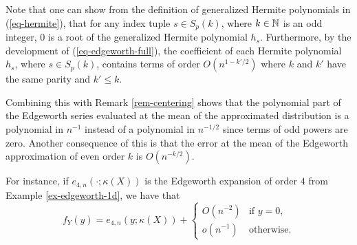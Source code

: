 \begin{remark} \label{rem-edge-mean}
    Note that one can show from the definition of generalized Hermite polynomials in (\ref{eq-hermite}), that for any index tuple $s \in S_p(k)$, where $k \in \mathbb{N}$ is an odd integer, 0 is a root of the generalized Hermite polynomial $h_s$. 
    Furthermore, by the development of (\ref{eq-edgeworth-full}), the coefficient of each Hermite polynomial $h_s$, where $s \in S_p(k)$, contains terms of order $O(n^{1-k'/2})$ where $k$ and $k'$ have the same parity and $k' \leq k$.

    Combining this with Remark \ref{rem-centering} shows that the polynomial part of the Edgeworth series evaluated at the mean of the approximated distribution is a polynomial in $n^{-1}$ instead of a polynomial in $n^{-1/2}$ since terms of odd powers are zero. Another consequence of this is that the error at the mean of the Edgeworth approximation of even order $k$ is $O(n^{-k/2})$. 
    
    For instance, if $e_{4, n}(\cdot; \kappa(X))$ is the Edgeworth expansion of order $4$ from Example \ref{ex-edgeworth-1d}, we have that
    \begin{equation*}
        f_Y(y) = e_{4, n}(y; \kappa(X)) + \begin{cases}
            O(n^{-2}) &\text{if } y = 0,\\
            o(n^{-1}) &\text{otherwise}.
        \end{cases} 
    \end{equation*} 
\end{remark}

